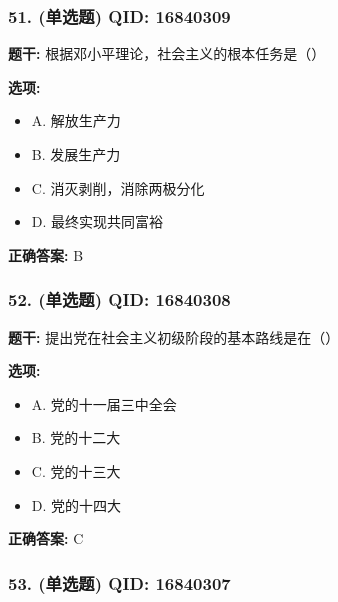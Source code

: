 \documentclass[12pt,UTF8]{ctexart}
\begin{document}
\subsubsection*{51. (单选题) \small QID: 16840309}

\textbf{题干:}
根据邓小平理论，社会主义的根本任务是（）

\textbf{选项:}
\begin{itemize}[leftmargin=*]

  \item A. 解放生产力

  \item B. 发展生产力

  \item C. 消灭剥削，消除两极分化

  \item D. 最终实现共同富裕

\end{itemize}

\textbf{正确答案:}
B

\vspace{0.3em}\hrulefill\vspace{0.7em}

\subsubsection*{52. (单选题) \small QID: 16840308}

\textbf{题干:}
提出党在社会主义初级阶段的基本路线是在（）

\textbf{选项:}
\begin{itemize}[leftmargin=*]

  \item A. 党的十一届三中全会

  \item B. 党的十二大

  \item C. 党的十三大

  \item D. 党的十四大

\end{itemize}

\textbf{正确答案:}
C

\vspace{0.3em}\hrulefill\vspace{0.7em}

\subsubsection*{53. (单选题) \small QID: 16840307}
\end{document}
